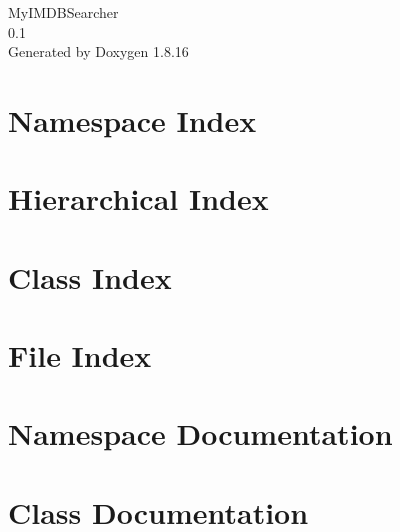 \let\mypdfximage\pdfximage\def\pdfximage{\immediate\mypdfximage}\documentclass[twoside]{book}
\newcommand{\+}{\discretionary{\mbox{\scriptsize$\hookleftarrow$}}{}{}}
\newcommand{\clearemptydoublepage}{%
  \newpage{\pagestyle{empty}\cleardoublepage}%
}
\begin{document}
\begin{titlepage}
\vspace*{7cm}
\begin{center}%
{\Large My\+I\+M\+D\+B\+Searcher \\[1ex]\large 0.\+1 }\\
\vspace*{1cm}
{\large Generated by Doxygen 1.8.16}\\
\end{center}
\end{titlepage}
\clearemptydoublepage
{}
\tableofcontents
\clearemptydoublepage
{}

\chapter{Namespace Index}

\chapter{Hierarchical Index}

\chapter{Class Index}

\chapter{File Index}

\chapter{Namespace Documentation}

\chapter{Class Documentation}























\end{document}
